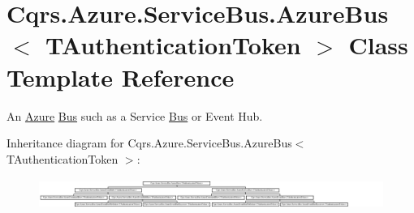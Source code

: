 \hypertarget{classCqrs_1_1Azure_1_1ServiceBus_1_1AzureBus}{}\section{Cqrs.\+Azure.\+Service\+Bus.\+Azure\+Bus$<$ T\+Authentication\+Token $>$ Class Template Reference}
\label{classCqrs_1_1Azure_1_1ServiceBus_1_1AzureBus}


An \hyperlink{namespaceCqrs_1_1Azure}{Azure} \hyperlink{namespaceCqrs_1_1Bus}{Bus} such as a Service \hyperlink{namespaceCqrs_1_1Bus}{Bus} or Event Hub.  


Inheritance diagram for Cqrs.\+Azure.\+Service\+Bus.\+Azure\+Bus$<$ T\+Authentication\+Token $>$\+:\begin{figure}[H]
\begin{center}
\leavevmode
\includegraphics[height=1.013575cm]{classCqrs_1_1Azure_1_1ServiceBus_1_1AzureBus}
\end{center}
\end{figure}
